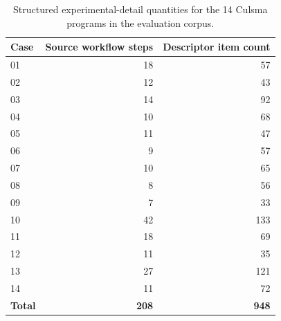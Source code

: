 \begin{table}[H]
\centering
\scriptsize
\begin{tabular}{@{}lrr@{}}
\toprule
\textbf{Case} & \textbf{Source workflow steps} & \textbf{Descriptor item count} \\
\midrule
01 & 18 & 57 \\
02 & 12 & 43 \\
03 & 14 & 92 \\
04 & 10 & 68 \\
05 & 11 & 47 \\
06 & 9 & 57 \\
07 & 10 & 65 \\
08 & 8 & 56 \\
09 & 7 & 33 \\
10 & 42 & 133 \\
11 & 18 & 69 \\
12 & 11 & 35 \\
13 & 27 & 121 \\
14 & 11 & 72 \\
\midrule
\textbf{Total} & \textbf{208} & \textbf{948} \\
\bottomrule
\end{tabular}
\caption{Structured experimental-detail quantities for the 14 Culsma programs in the evaluation corpus.}
\label{tab:semantic-capture-corpus-counts}
\end{table}

\begin{table}[H]
\centering
\small
{}
\caption{Material-state continuity across the 14 benchmark programs. Object records contain 114 tracked reused objects and 281 later-use links. All 4663 generated active steps completed; the total counts the steps on the paths activated by each program.}
\label{tab:executable-continuity-corpus-counts}
\end{table}

